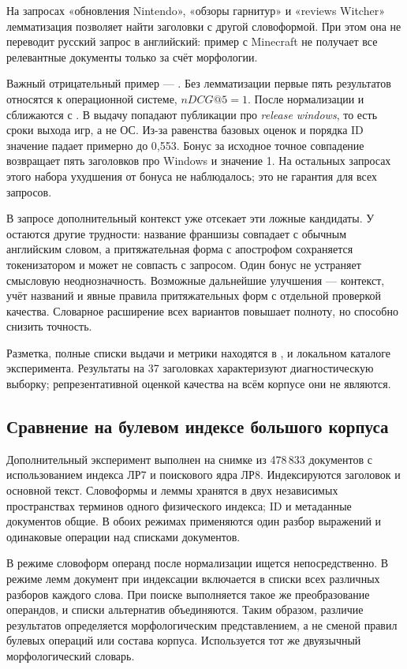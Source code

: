\documentclass[12pt,a4paper]{article}
\newcommand{\code}[1]{\texttt{\detokenize{#1}}}
\begin{document}
На запросах «обновления Nintendo», «обзоры гарнитур» и «reviews Witcher»
лемматизация позволяет найти заголовки с другой словоформой. При этом
она не переводит русский запрос в английский: пример с Minecraft
не получает все релевантные документы только за счёт морфологии.

Важный отрицательный пример --- \code{Windows}. Без лемматизации первые
пять результатов относятся к операционной системе, $nDCG@5=1$.
После нормализации \code{Windows} и \code{windows} сближаются с
\code{window}. В выдачу попадают публикации про \emph{release windows},
то есть сроки выхода игр, а не ОС. Из-за равенства базовых оценок и порядка ID
значение падает примерно до 0,553. Бонус за исходное точное совпадение
возвращает пять заголовков про Windows и значение 1. На остальных запросах
этого набора ухудшения от бонуса не наблюдалось; это не гарантия для всех запросов.

В запросе \code{Windows 10} дополнительный контекст уже отсекает эти
ложные кандидаты. У \code{Saw} остаются другие трудности: название франшизы
совпадает с обычным английским словом, а притяжательная форма с апострофом
сохраняется токенизатором и может не совпасть с запросом. Один бонус
не устраняет смысловую неоднозначность. Возможные дальнейшие улучшения ---
контекст, учёт названий и явные правила притяжательных форм с отдельной
проверкой качества. Словарное расширение всех вариантов повышает полноту,
но способно снизить точность.

Разметка, полные списки выдачи и метрики находятся в
, 
и локальном каталоге эксперимента. Результаты на 37 заголовках
характеризуют диагностическую выборку; репрезентативной оценкой
качества на всём корпусе они не являются.

\subsection{Сравнение на булевом индексе большого корпуса}

Дополнительный эксперимент выполнен на снимке из 478\,833 документов
с использованием индекса ЛР7 и поискового ядра ЛР8. Индексируются
заголовок и основной текст. Словоформы и леммы хранятся в двух
независимых пространствах терминов одного физического индекса;
ID и метаданные документов общие. В обоих режимах применяются
один разбор выражений и одинаковые операции над списками документов.

В режиме словоформ операнд после нормализации ищется непосредственно.
В режиме лемм документ при индексации включается в списки всех
различных разборов каждого слова. При поиске выполняется такое же
преобразование операндов, и списки альтернатив объединяются.
Таким образом, различие результатов определяется морфологическим
представлением, а не сменой правил булевых операций или состава корпуса.
Используется тот же двуязычный морфологический словарь.
\end{document}
